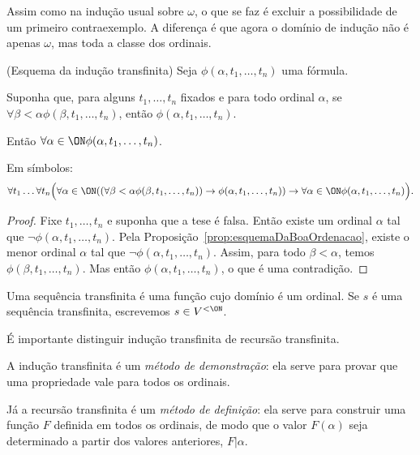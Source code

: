 Assim como na indução usual sobre $\omega$, o que se faz é excluir a possibilidade de um primeiro contraexemplo. A diferença é que agora o domínio de indução não é apenas $\omega$, mas toda a classe dos ordinais.

\begin{proposition}[$\BST$](Esquema da indução transfinita)\label{prop:esquemaDaInducaoTransfinita}
    Seja $\phi(\alpha, t_1, \dots, t_n)$ uma fórmula.
    
    Suponha que, para alguns $t_1, \dots, t_n$ fixados e para todo ordinal $\alpha$, se $\forall \beta <\alpha \phi(\beta, t_1, \dots, t_n)$, então $\phi(\alpha, t_1, \dots, t_n)$.

    Então $\forall \alpha \in \ON \phi(\alpha, t_1, \dots, t_n)$.
    
    Em símbolos:
    \[
        \forall t_1 \dots \forall t_n \Big( \forall \alpha \in \ON ((\forall \beta <\alpha \phi(\beta, t_1, \dots, t_n)) \rightarrow \phi(\alpha, t_1, \dots, t_n)) \rightarrow \forall \alpha \in \ON \phi(\alpha, t_1, \dots, t_n)\Big).
    \]
\end{proposition}
\begin{proof}
    Fixe $t_1, \dots, t_n$ e suponha que a tese é falsa.
    Então existe um ordinal $\alpha$ tal que $\neg\phi(\alpha, t_1, \dots, t_n)$.
    Pela Proposição~\ref{prop:esquemaDaBoaOrdenacao}, existe o menor ordinal $\alpha$ tal que $\neg\phi(\alpha, t_1, \dots, t_n)$.
    Assim, para todo $\beta <\alpha$, temos $\phi(\beta, t_1, \dots, t_n)$.
    Mas então $\phi(\alpha, t_1, \dots, t_n)$, o que é uma contradição.
\end{proof}

\begin{definition}[$\BST$]\label{def:sequenciaTransfinita}
    Uma sequência transfinita é uma função cujo domínio é um ordinal.
    Se $s$ é uma sequência transfinita, escrevemos $s \in V^{<\ON}$.
\end{definition}

É importante distinguir indução transfinita de recursão transfinita.

A indução transfinita é um \emph{método de demonstração}: ela serve para provar que uma propriedade vale para todos os ordinais.

Já a recursão transfinita é um \emph{método de definição}: ela serve para construir uma função $F$ definida em todos os ordinais, de modo que o valor $F(\alpha)$ seja determinado a partir dos valores anteriores, $F|\alpha$.

